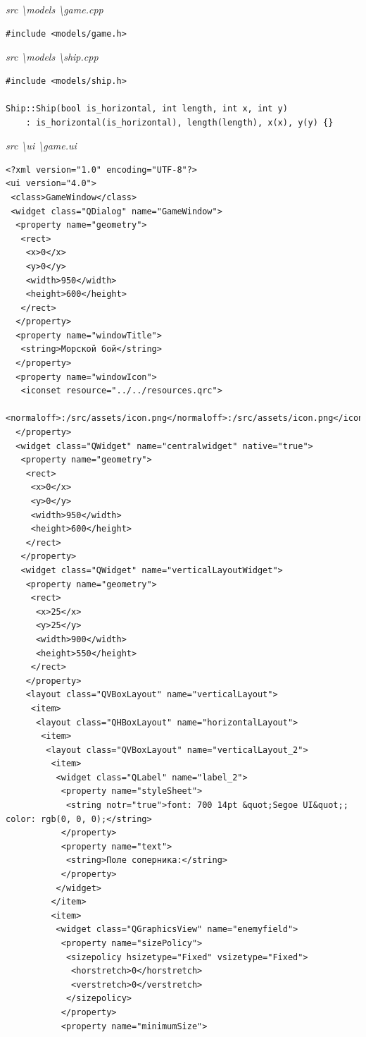 \documentclass[a4paper,14pt]{extarticle}
\begin{document}
\textit{src \textbackslash models \textbackslash game.cpp}
\begin{verbatim}
#include <models/game.h>

\end{verbatim}
\textit{src \textbackslash models \textbackslash ship.cpp}
\begin{verbatim}
#include <models/ship.h>

Ship::Ship(bool is_horizontal, int length, int x, int y)
    : is_horizontal(is_horizontal), length(length), x(x), y(y) {}

\end{verbatim}
\textit{src \textbackslash ui \textbackslash game.ui}
\begin{verbatim}
<?xml version="1.0" encoding="UTF-8"?>
<ui version="4.0">
 <class>GameWindow</class>
 <widget class="QDialog" name="GameWindow">
  <property name="geometry">
   <rect>
    <x>0</x>
    <y>0</y>
    <width>950</width>
    <height>600</height>
   </rect>
  </property>
  <property name="windowTitle">
   <string>Морской бой</string>
  </property>
  <property name="windowIcon">
   <iconset resource="../../resources.qrc">
    <normaloff>:/src/assets/icon.png</normaloff>:/src/assets/icon.png</iconset>
  </property>
  <widget class="QWidget" name="centralwidget" native="true">
   <property name="geometry">
    <rect>
     <x>0</x>
     <y>0</y>
     <width>950</width>
     <height>600</height>
    </rect>
   </property>
   <widget class="QWidget" name="verticalLayoutWidget">
    <property name="geometry">
     <rect>
      <x>25</x>
      <y>25</y>
      <width>900</width>
      <height>550</height>
     </rect>
    </property>
    <layout class="QVBoxLayout" name="verticalLayout">
     <item>
      <layout class="QHBoxLayout" name="horizontalLayout">
       <item>
        <layout class="QVBoxLayout" name="verticalLayout_2">
         <item>
          <widget class="QLabel" name="label_2">
           <property name="styleSheet">
            <string notr="true">font: 700 14pt &quot;Segoe UI&quot;; color: rgb(0, 0, 0);</string>
           </property>
           <property name="text">
            <string>Поле соперника:</string>
           </property>
          </widget>
         </item>
         <item>
          <widget class="QGraphicsView" name="enemyfield">
           <property name="sizePolicy">
            <sizepolicy hsizetype="Fixed" vsizetype="Fixed">
             <horstretch>0</horstretch>
             <verstretch>0</verstretch>
            </sizepolicy>
           </property>
           <property name="minimumSize">

\end{verbatim}
\end{document}
